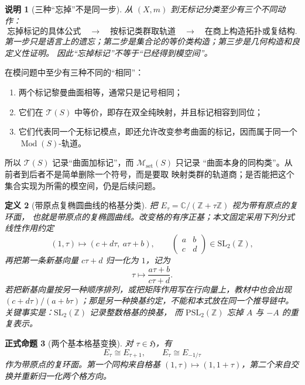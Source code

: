 \documentclass[UTF8,fontset=none,a4paper,11pt]{ctexart}
\theoremstyle{foundation-definition}
\newtheorem{definition}{定义}[section]
\theoremstyle{foundation-theorem}
\theoremstyle{foundation-proposition}
\newtheorem{proposition}[definition]{正式命题}
\theoremstyle{foundation-example}
\theoremstyle{foundation-remark}
\newtheorem{remark}[definition]{说明}
\theoremstyle{foundation-theorem}
\newcommand{\T}{\mathcal T}
\newcommand{\M}{\mathcal M}
\newcommand{\Mod}{\operatorname{Mod}}
\begin{document}
\begin{remark}[三种“忘掉”不是同一步]\label{rem:three-forgetting-steps}
从 \((X,m)\) 到无标记分类至少有三个不同动作：
\[
\text{忘掉标记的具体公式}
\quad\longrightarrow\quad
\text{按标记类群取轨道}
\quad\longrightarrow\quad
\text{在商上构造拓扑或复结构}.
\]
第一步只是语言上的遗忘；第二步是集合论的等价类构造；第三步是几何构造和良定义性证明。
因此“忘掉标记”不等于“已经得到模空间”。
\end{remark}

在模问题中至少有三种不同的“相同”：
\begin{enumerate}[label=(\arabic*)]
  \item 两个标记黎曼曲面相等，通常只是记号相同；
  \item 它们在 \(\T(S)\) 中等价，即存在双全纯映射，并且标记相容到同位；
  \item 它们代表同一个无标记模点，即还允许改变参考曲面的标记，因而属于同一个 \(\Mod(S)\)-轨道。
\end{enumerate}
所以 \(\T(S)\) 记录“曲面加标记”，而 \(\M_{\mathrm{set}}(S)\) 只记录
“曲面本身的同构类”。从前者到后者不是简单删除一个符号，而是要取
映射类群的轨道商；是否能把这个集合实现为所需的模空间，仍是后续问题。

\begin{definition}[带原点复椭圆曲线的格基分类]\label{def:elliptic-lattice-classification}
把 \(E_\tau=\mathbb C/(\mathbb Z+\tau\mathbb Z)\) 视为带有原点的复环面，
也就是带原点的复椭圆曲线。改变格的有序正基；本文固定采用下列分式线性作用约定
\[
(1,\tau)\longmapsto (c+d\tau,\ a\tau+b),
\qquad
\begin{pmatrix}a&b\\c&d\end{pmatrix}\in\mathrm{SL}_2(\mathbb Z),
\]
再把第一条新基向量 \(c\tau+d\) 归一化为 \(1\)，记为
\[
\tau\longmapsto\frac{a\tau+b}{c\tau+d}.
\]
若把新基向量按另一种顺序排列，或把矩阵作用写在行向量上，教材中也会出现
\((c+d\tau)/(a+b\tau)\)；那是另一种换基约定，不能和本式放在同一个推导链中。
关键事实是：\(\mathrm{SL}_2(\mathbb Z)\) 记录整数格基的换基，
而 \(\mathrm{PSL}_2(\mathbb Z)\) 忘掉 \(A\) 与 \(-A\) 的重复表示。
\end{definition}

\begin{proposition}[两个基本格基变换]
对 \(\tau\in\mathfrak H\)，有
\[
E_\tau\cong E_{\tau+1},
\qquad
E_\tau\cong E_{-1/\tau}
\]
作为带原点的复环面。第一个同构来自格基 \((1,\tau)\mapsto(1,1+\tau)\)，第二个来自交换并重新归一化两个格方向。
\end{proposition}
\end{document}
